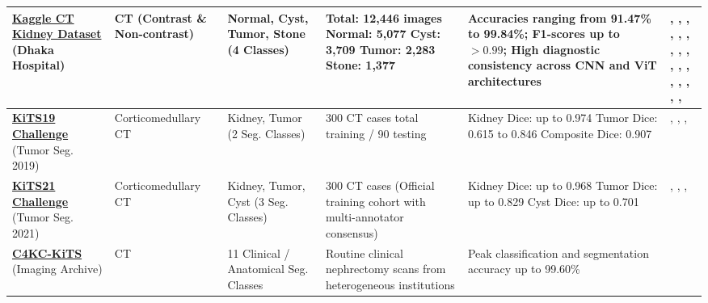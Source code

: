 \documentclass[pdflatex,sn-mathphys-num]{sn-jnl}%
\begin{document}
\begin{longtable}{|L{2.2cm}|L{1.3cm}|L{1.6cm}|L{2.2cm}|L{2.8cm}|L{1.7cm}|}
\textbf{\href{https://www.kaggle.com/datasets/nazmul0087/ct-kidney-dataset-normal-cyst-tumor-and-stone}{Kaggle CT Kidney Dataset}} \newline (Dhaka Hospital) & CT (Contrast \& Non-contrast) & Normal, Cyst, Tumor, Stone (4 Classes) & Total: 12,446 images \newline Normal: 5,077 \newline Cyst: 3,709 \newline Tumor: 2,283 \newline Stone: 1,377 & Accuracies ranging from 91.47\% to 99.84\%; F1-scores up to $>0.99$; High diagnostic consistency across CNN and ViT architectures & \cite{khan2025multilevel}, \cite{verma2025automated}, \cite{rajendran2025kidney}, \cite{bhandari2023lightweight}, \cite{rathva2025ensemble}, \cite{tarul2025empirical}, \cite{pimpalkar2025fine}, \cite{alqahtani2025kidneynext}, \cite{islam2022vision}, \cite{sajid2026yolov8}, \cite{alebada2026hybrid}, \cite{hossain2024adaptive}, \cite{sharma2025hybrid}, \cite{martin2025evaluation}, \cite{ahmed2021ct}, \cite{tawfik2026pcsa}, \cite{hossain2025detection}, \cite{macin2025kidneynext} \\
\hline
\textbf{\href{https://github.com/neheller/kits19/tree/master/data}{KiTS19 Challenge}} \newline (Tumor Seg. 2019) & Corticomedullary CT & Kidney, Tumor (2 Seg. Classes) & 300 CT cases total  training / 90 testing & Kidney Dice: up to 0.974 \newline Tumor Dice: 0.615 to 0.846 \newline Composite Dice: 0.907 & \cite{ji2024asdnet}, \cite{abdelrahman2023efficientnet}, \cite{hatsutani2023protuberance}, \cite{xie2020seru} \\
\hline
\textbf{\href{https://github.com/neheller/kits21/tree/master/kits21/data}{KiTS21 Challenge}} \newline (Tumor Seg. 2021) & Corticomedullary CT & Kidney, Tumor, Cyst (3 Seg. Classes) & 300 CT cases (Official training cohort with multi-annotator consensus) & Kidney Dice: up to 0.968 \newline Tumor Dice: up to 0.829 \newline Cyst Dice: up to 0.701 & \cite{heller2023kits21}, \cite{gohil2024kidney}, \cite{zhao2023automatic}, \cite{chen20215d} \\
\hline
\textbf{\href{https://www.cancerimagingarchive.net/collection/c4kc-kits/}{C4KC-KiTS}} \newline (Imaging Archive) & CT & 11 Clinical / Anatomical Seg. Classes & Routine clinical nephrectomy scans from heterogeneous institutions & Peak classification and segmentation accuracy up to 99.60\% & \cite{sherryl2022ied} \\

\end{longtable}
\end{document}
